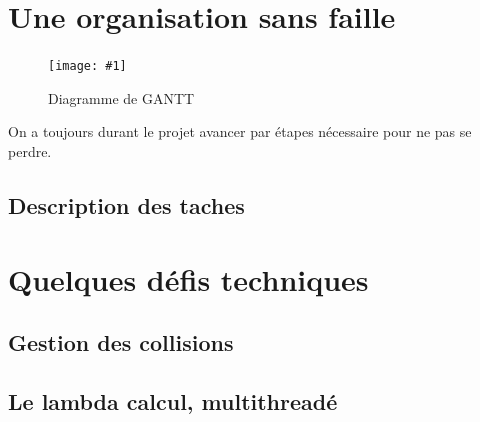 \documentclass[french,12pt]{article}
\newcommand{\monimage}[4]{
\par\noindent
\begin{figure}[p] %
\begin{center}
\texttt{[image: \#1]} %
\caption{#2} %
\label{#3} %
\end{center}
\end{figure} %
}
\begin{document}
\section{Une organisation sans faille}

\monimage{gantt.pdf}{Diagramme de GANTT}{dg}{1}

On a toujours durant le projet avancer par étapes nécessaire pour ne pas se perdre.



\subsection{Description des taches}



\section{Quelques défis techniques}


\subsection{Gestion des collisions}


\subsection{Le lambda calcul, multithreadé}


\newpage
\listoffigures
\newpage
\end{document}
